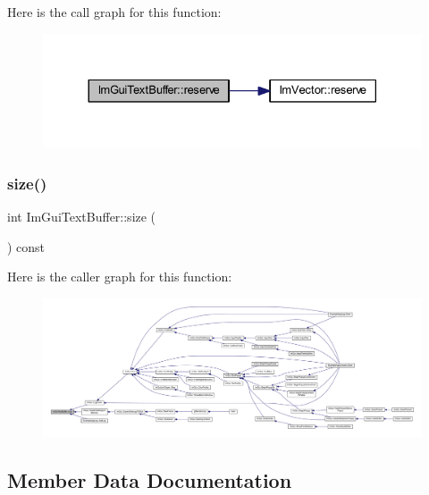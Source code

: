 Here is the call graph for this function\+:
\nopagebreak
\begin{figure}[H]
\begin{center}
\leavevmode
\includegraphics[width=330pt]{struct_im_gui_text_buffer_a3271f361e0f1997f4c3eb77665fdf161_cgraph}
\end{center}
\end{figure}
\mbox{\label{struct_im_gui_text_buffer_a2811fcd43e0224eb3bd0f3464b634289}} 
\subsubsection{\texorpdfstring{size()}{size()}}
{\footnotesize\ttfamily int Im\+Gui\+Text\+Buffer\+::size (\begin{DoxyParamCaption}{ }\end{DoxyParamCaption}) const\hspace{0.3cm}{\ttfamily [inline]}}

Here is the caller graph for this function\+:
\nopagebreak
\begin{figure}[H]
\begin{center}
\leavevmode
\includegraphics[width=350pt]{struct_im_gui_text_buffer_a2811fcd43e0224eb3bd0f3464b634289_icgraph}
\end{center}
\end{figure}


\subsection{Member Data Documentation}
\mbox{\label{struct_im_gui_text_buffer_aa6de034b1920cdae5505cc58abf14240}} 
